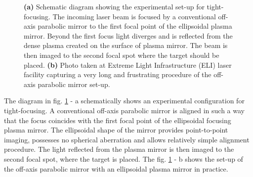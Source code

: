\begin{figure}[h!]
	\centering
	\hspace{5mm}
	\caption{\textbf{(a)} Schematic diagram showing the experimental set-up for tight-focusing. The incoming laser beam is focused by a conventional off-axis parabolic mirror to the first focal point of the ellipsoidal plasma mirror. Beyond the first focus light diverges and is reflected from the dense plasma created on the surface of plasma mirror. The beam is then imaged to the second focal spot where the target should be placed. \textbf{(b)} Photo taken at Extreme Light Infrastructure (ELI) laser facility capturing a very long and frustrating procedure of the off-axis parabolic mirror set-up.}
	\label{fig:9}
\end{figure}

The diagram in fig. \ref{fig:9} - a schematically shows an experimental configuration for tight-focusing. A conventional off-axis parabolic mirror is aligned in such a way that the focus coincides with the first focal point of the ellipsoidal focusing plasma mirror. The ellipsoidal shape of the mirror provides point-to-point imaging, possesses no spherical aberration and allows relatively simple alignment procedure. The light reflected from the plasma mirror is then imaged to the second focal spot, where the target is placed. The fig. \ref{fig:9} - b shows the set-up of the off-axis parabolic mirror with an ellipsoidal plasma mirror in practice.